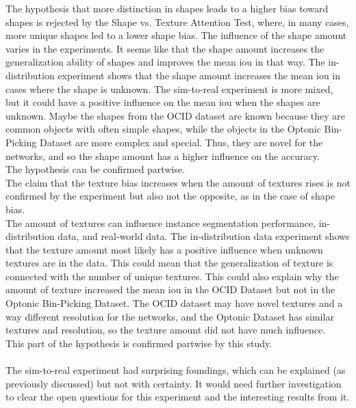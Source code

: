 		The hypothesis that more distinction in shapes leads to a higher bias toward shapes is rejected by the Shape vs. Texture Attention Test, where, in many cases, more unique shapes led to a lower shape bias.
		The influence of the shape amount varies in the experiments. It seems like that the shape amount increases the generalization ability of shapes and improves the mean \ac{iou} in that way. The in-distribution experiment shows that the shape amount increases the mean \ac{iou} in cases where the shape is unknown. The sim-to-real experiment is more mixed, but it could have a positive influence on the mean \ac{iou} when the shapes are unknown. Maybe the shapes from the OCID dataset are known because they are common objects with often simple shapes, while the objects in the Optonic Bin-Picking Dataset are more complex and special. Thus, they are novel for the networks, and so the shape amount has a higher influence on the accuracy.\\
		The hypothesis can be confirmed partwise.\\
		The claim that the texture bias increases when the amount of textures rises is not confirmed by the experiment but also not the opposite, as in the case of shape bias.\\
		The amount of textures can influence instance segmentation performance, in-distribution data, and real-world data. The in-distribution data experiment shows that the texture amount most likely has a positive influence when unknown textures are in the data. This could mean that the generalization of texture is connected with the number of unique textures. This could also explain why the amount of texture increased the mean \ac{iou} in the OCID Dataset but not in the Optonic Bin-Picking Dataset. The OCID dataset may have novel textures and a way different resolution for the networks, and the Optonic Dataset has similar textures and resolution, so the texture amount did not have much influence.\\
		This part of the hypothesis is confirmed partwise by this study.\\
		\\
		The sim-to-real experiment had surprising foundings, which can be explained (as previously discussed) but not with certainty. It would need further investigation to clear the open questions for this experiment and the interesting results from it.
		
		
	

